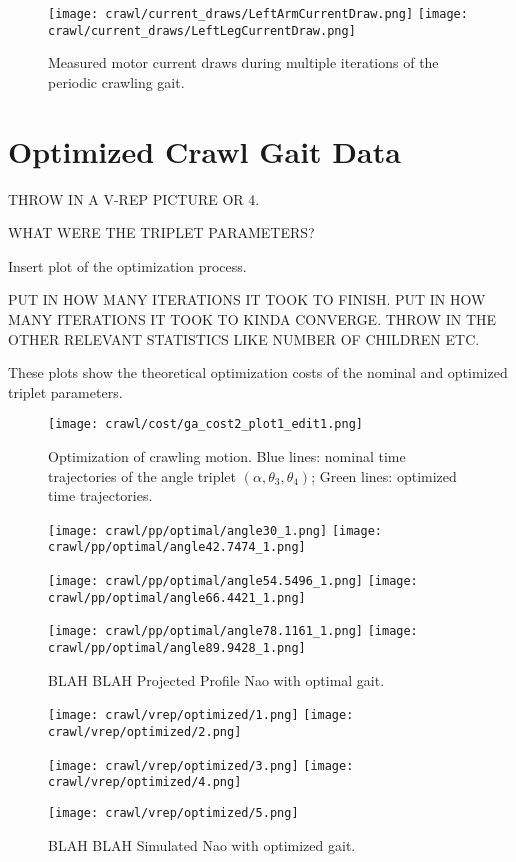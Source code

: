 \begin{figure}
  \centerline{
    \texttt{[image: crawl/current\_draws/LeftArmCurrentDraw.png]}
    \texttt{[image: crawl/current\_draws/LeftLegCurrentDraw.png]}
  }
  \caption{Measured motor current draws during multiple iterations of the periodic crawling gait.}
  \label{fig:nao_currents}
\end{figure}

\section{Optimized Crawl Gait Data}

THROW IN A V-REP PICTURE OR 4.


WHAT WERE THE TRIPLET PARAMETERS?

Insert plot of the optimization process.

PUT IN HOW MANY ITERATIONS IT TOOK TO FINISH.
PUT IN HOW MANY ITERATIONS IT TOOK TO KINDA CONVERGE.
THROW IN THE OTHER RELEVANT STATISTICS LIKE NUMBER OF CHILDREN ETC.

These plots show the theoretical optimization costs of the nominal and optimized
triplet parameters. 

\begin{figure}
  \centerline{
    \texttt{[image: crawl/cost/ga\_cost2\_plot1\_edit1.png]}
  }
  \caption{Optimization of crawling motion. Blue lines: nominal time trajectories of the angle triplet 
           $(\alpha,\theta_3,\theta_4)$; Green lines: optimized time trajectories. }
  \label{fig:optimal}
\end{figure}

\begin{figure}
  \centerline{
    \texttt{[image: crawl/pp/optimal/angle30\_1.png]}
    \texttt{[image: crawl/pp/optimal/angle42.7474\_1.png]}
  }
  \centerline{
    \texttt{[image: crawl/pp/optimal/angle54.5496\_1.png]}
    \texttt{[image: crawl/pp/optimal/angle66.4421\_1.png]}
  }
  \centerline{
    \texttt{[image: crawl/pp/optimal/angle78.1161\_1.png]}
    \texttt{[image: crawl/pp/optimal/angle89.9428\_1.png]}
  }
  \caption{BLAH BLAH Projected Profile Nao with optimal gait.}
  \label{fig:pp_opt_gait1}
\end{figure}

\begin{figure}
  \centerline{
    \texttt{[image: crawl/vrep/optimized/1.png]}
    \texttt{[image: crawl/vrep/optimized/2.png]}
  }
  \centerline{
    \texttt{[image: crawl/vrep/optimized/3.png]}
    \texttt{[image: crawl/vrep/optimized/4.png]}
  }
  \centerline{
    \texttt{[image: crawl/vrep/optimized/5.png]}
  }
  \caption{BLAH BLAH Simulated Nao with optimized gait.}
  \label{fig:vrep_nao_opt_gait1}
\end{figure}

